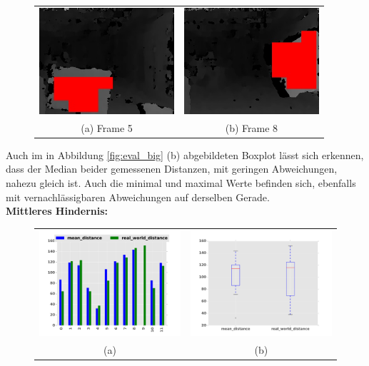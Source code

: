 \begin{figure}[h]
	\centering
	\begin{tabular}{cc}
	\includegraphics[width=5cm]{img/evaluation/_test_5_disparity}&
	\includegraphics[width=5cm]{img/evaluation/_test_8_disparity}\\
	(a) Frame 5 &  (b) Frame 8
	\end{tabular}
	\caption{}
    \label{fig:eval_big_fails}
\end{figure}

\noindent
Auch im in Abbildung \ref{fig:eval_big} (b) abgebildeten Boxplot lässt sich erkennen, dass der Median beider gemessenen Distanzen, mit geringen Abweichungen, nahezu gleich ist. Auch die minimal und maximal Werte befinden sich, ebenfalls mit vernachlässigbaren Abweichungen auf derselben Gerade.\\

\noindent
\textbf{Mittleres Hindernis:}\\
\begin{figure}[h]
	\centering
	\begin{tabular}{cc}
	\includegraphics[width=7cm]{img/evaluation/diagrams/sub_medium_bar}&
	\includegraphics[width=7cm]{img/evaluation/diagrams/sub_medium_box}\\
	(a) &  (b)
	\end{tabular}
    \caption{}
    \label{fig:eval_medium}
\end{figure}

